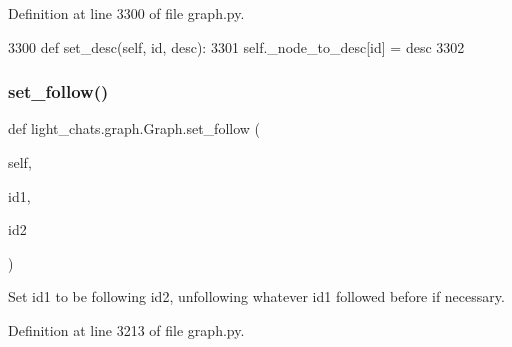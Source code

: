 Definition at line 3300 of file graph.\+py.


\begin{DoxyCode}
3300     \textcolor{keyword}{def }set\_desc(self, id, desc):
3301         self.\_node\_to\_desc[id] = desc
3302 
\end{DoxyCode}
\mbox{\label{classlight__chats_1_1graph_1_1Graph_a729d07bc1da395a60d3431cec5bb439b}} 
\subsubsection{\texorpdfstring{set\+\_\+follow()}{set\_follow()}}
{\footnotesize\ttfamily def light\+\_\+chats.\+graph.\+Graph.\+set\+\_\+follow (\begin{DoxyParamCaption}\item[{}]{self,  }\item[{}]{id1,  }\item[{}]{id2 }\end{DoxyParamCaption})}

\begin{DoxyVerb}Set id1 to be following id2, unfollowing whatever id1 followed before if
necessary.
\end{DoxyVerb}
 

Definition at line 3213 of file graph.\+py.


